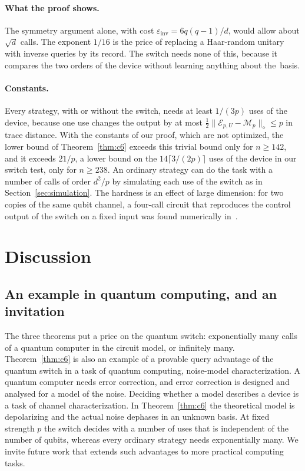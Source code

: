 \documentclass[11pt,letterpaper]{article}
\theoremstyle{definition}\newtheorem{definition}[theorem]{Definition}
\newcommand{\norm}[1]{\lVert#1\rVert}
\begin{document}
\paragraph{What the proof shows.}
The symmetry argument alone, with cost
$\varepsilon_{\mathrm{inv}}=6q(q-1)/d$, would allow about $\sqrt d$
calls. The exponent $1/16$ is the price of replacing a Haar-random
unitary with inverse queries by its record. The switch needs none of
this, because it compares the two orders of the device without learning
anything about the~basis.

\paragraph{Constants.}
Every strategy, with or without the switch, needs at least $1/(3p)$
uses of the device, because one use changes the output by at most
$\frac12\norm{\mathcal E_{p,U}-\mathcal M_p}_\diamond\le p$ in trace
distance. With the constants of our proof, which are not optimized, the
lower bound of Theorem~\ref{thm:c6} exceeds this trivial bound only for
$n\ge142$, and it exceeds $21/p$, a lower bound on the
$14\lceil3/(2p)\rceil$ uses of the device in our switch test, only for
$n\ge238$. An ordinary strategy can do the task with a number of calls
of order $d^2/p$ by simulating each use of the switch as in
Section~\ref{sec:simulation}. The hardness is an effect of large
dimension: for two copies of the same qubit channel, a four-call circuit that reproduces the control output
of the switch on a fixed input was found numerically
in~\cite{bavaresco2025}.
\section{Discussion}\label{sec:discussion}

\subsection{An example in quantum computing, and an invitation}\label{sec:where}\label{sec:open}

The three theorems put a price on the quantum switch: exponentially
many calls of a quantum computer in the circuit model, or infinitely
many. Theorem~\ref{thm:c6} is also an example of a provable query
advantage of the quantum switch in a task of quantum computing,
noise-model characterization. A quantum computer needs error
correction, and error correction is designed and analysed for a model
of the noise. Deciding whether a
model describes a device is a task of channel characterization. In
Theorem~\ref{thm:c6} the theoretical model is depolarizing and the
actual noise dephases in an unknown basis. At fixed strength $p$ the
switch decides with a number of uses that is independent of the number
of qubits, whereas every ordinary strategy needs exponentially many.
We invite future work that extends such advantages to more practical
computing tasks.
\end{document}
